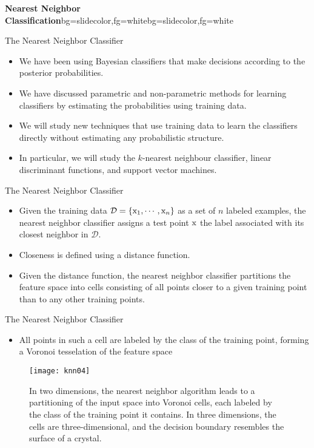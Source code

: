 \begin{frame}{}
\begin{variableblock}{\centering \Large \textbf{\vspace{4pt}\newline Nearest Neighbor Classification\vspace{4pt}}}{bg=slidecolor,fg=white}{bg=slidecolor,fg=white}
\end{variableblock}
\end{frame}

\begin{frame}{The Nearest Neighbor Classifier}
\begin{itemize}
\item We have been using Bayesian classifiers that make decisions according to the posterior probabilities.
􏰂\item We have discussed parametric and non-parametric methods for learning classifiers by estimating the probabilities using training data.
􏰂\item We will study new techniques that use training data to learn the classifiers directly without estimating any probabilistic structure.
􏰂\item In particular, we will study the $k$-nearest neighbour classifier, linear discriminant functions, and support vector machines.
\end{itemize}
\end{frame}

\begin{frame}{The Nearest Neighbor Classifier}
\begin{itemize}
\item Given the training data $\mathcal{D} = \{{\rm x}_1,\cdots,{\rm x}_n\}$ as a set of $n$ labeled examples, the {\color{mycolor2}nearest neighbor classifier} assigns a test point ${\rm x}$ the label associated with its closest neighbor in $\mathcal{D}$.
􏰂\item Closeness is defined using a distance function.
􏰂\item Given the distance function, the nearest neighbor classifier partitions the feature space into cells consisting of all points closer to a given training point than to any other training points.
\end{itemize}
\end{frame}

\begin{frame}{The Nearest Neighbor Classifier}
\begin{itemize}
\item All points in such a cell are labeled by the class of the training point, forming a {\color{mycolor2} Voronoi tesselation} of the feature space
\end{itemize}
\begin{figure}
\texttt{[image: knn04]}
\caption{In two dimensions, the nearest neighbor algorithm leads to a partitioning of the input space into Voronoi cells, each labeled by the class of the training point it contains. In three dimensions, the cells are three-dimensional, and the decision boundary resembles the surface of a crystal.}
\end{figure}
\end{frame}

